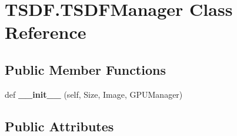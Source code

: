 \section{T\+S\+D\+F.\+T\+S\+D\+F\+Manager Class Reference}
\label{class_t_s_d_f_1_1_t_s_d_f_manager}
\subsection*{Public Member Functions}
\begin{DoxyCompactItemize}
\item 
def \textbf{ \+\_\+\+\_\+init\+\_\+\+\_\+} (self, Size, Image, G\+P\+U\+Manager)
\end{DoxyCompactItemize}
\subsection*{Public Attributes}
